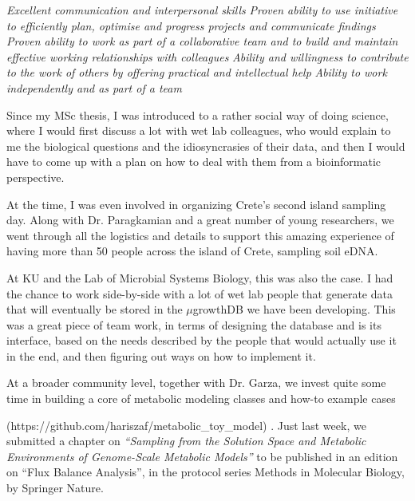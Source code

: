 \textit{Excellent communication and interpersonal skills}
\textit{
    Proven ability to use initiative to efficiently plan, optimise and 
    progress projects and communicate findings
}
\textit{
    Proven ability to work as part of a collaborative team and 
    to build and maintain effective working relationships with colleagues
}
\textit{
    Ability and willingness to contribute to the work of others 
    by offering practical and intellectual help
}
\textit{Ability to work independently and as part of a team}

    Since my MSc thesis, I was introduced to a rather social way of doing science,
    where I would first discuss a lot with wet lab colleagues, who would explain to me 
    the biological questions and the idiosyncrasies of their data,
    and then I would have to come up with a plan on how to deal with them from a bioinformatic perspective.

    At the time, I was even involved in organizing Crete's second island sampling day.
    Along with Dr. Paragkamian and a great number of young researchers, we went through 
    all the logistics and details to support 
    this amazing experience of having more than 50 people across the island of Crete, sampling soil eDNA.

    At KU and the Lab of Microbial Systems Biology, this was also the case. 
    I had the chance to work side-by-side with a lot of wet lab people that 
    generate data that will eventually be stored in the {$\mu$}growthDB we have been developing. 
    This was a great piece of team work, in terms of designing the database and is its interface, 
    based on the needs described by the people that would actually use it in the end,
    and then figuring out ways on how to implement it.

    At a broader community level, together with Dr. Garza, we invest quite some time in building a
    core of metabolic modeling classes and how-to example cases
    
    (https://github.com/hariszaf/metabolic\_toy\_model)
    .
    Just last week, we submitted a chapter on
    \textit{``Sampling from the Solution Space and Metabolic Environments of Genome-Scale Metabolic Models''}
    to be published in an edition on “Flux Balance Analysis”, in the protocol series 
    Methods in Molecular Biology, by Springer Nature. 

